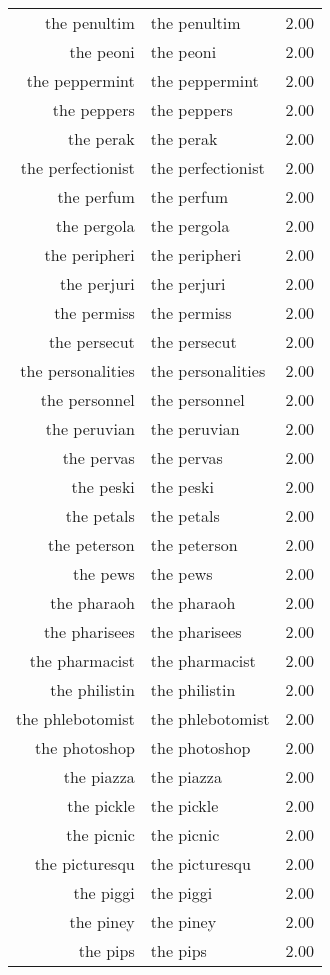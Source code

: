 \begin{table}[ht]
\begin{tabular}{rlr}
  the penultim & the penultim & 2.00 \\ 
  the peoni & the peoni & 2.00 \\ 
  the peppermint & the peppermint & 2.00 \\ 
  the peppers & the peppers & 2.00 \\ 
  the perak & the perak & 2.00 \\ 
  the perfectionist & the perfectionist & 2.00 \\ 
  the perfum & the perfum & 2.00 \\ 
  the pergola & the pergola & 2.00 \\ 
  the peripheri & the peripheri & 2.00 \\ 
  the perjuri & the perjuri & 2.00 \\ 
  the permiss & the permiss & 2.00 \\ 
  the persecut & the persecut & 2.00 \\ 
  the personalities & the personalities & 2.00 \\ 
  the personnel & the personnel & 2.00 \\ 
  the peruvian & the peruvian & 2.00 \\ 
  the pervas & the pervas & 2.00 \\ 
  the peski & the peski & 2.00 \\ 
  the petals & the petals & 2.00 \\ 
  the peterson & the peterson & 2.00 \\ 
  the pews & the pews & 2.00 \\ 
  the pharaoh & the pharaoh & 2.00 \\ 
  the pharisees & the pharisees & 2.00 \\ 
  the pharmacist & the pharmacist & 2.00 \\ 
  the philistin & the philistin & 2.00 \\ 
  the phlebotomist & the phlebotomist & 2.00 \\ 
  the photoshop & the photoshop & 2.00 \\ 
  the piazza & the piazza & 2.00 \\ 
  the pickle & the pickle & 2.00 \\ 
  the picnic & the picnic & 2.00 \\ 
  the picturesqu & the picturesqu & 2.00 \\ 
  the piggi & the piggi & 2.00 \\ 
  the piney & the piney & 2.00 \\ 
  the pips & the pips & 2.00 \\ 

\end{tabular}
\end{table}
